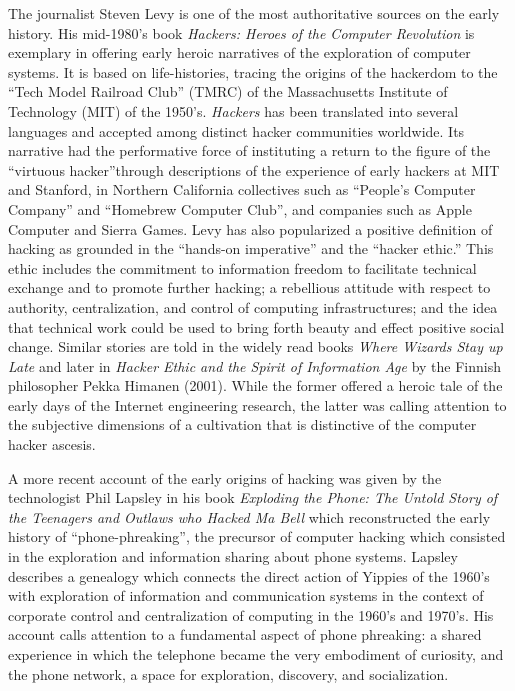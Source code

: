 \documentclass[10pt,letter,oneside]{scrartcl}
\begin{document}
The journalist Steven Levy is one of the most authoritative sources on the early
history. His mid-1980's book \emph{Hackers: Heroes of the Computer
  Revolution} \autocite{levy_hackers:_1984} is exemplary in offering early
heroic narratives of the exploration of computer systems. It is based on
life-histories, tracing the origins of the hackerdom to the ``Tech Model
Railroad Club'' (TMRC) of the Massachusetts Institute of Technology (MIT) of the
1950's. \emph{Hackers} has been translated into several languages and accepted
among distinct hacker communities worldwide.  Its narrative had the performative
force of instituting a return to the figure of the ``virtuous hacker''through
descriptions of the experience of early hackers at MIT and Stanford, in Northern
California collectives such as ``People's Computer Company'' and ``Homebrew
Computer Club'', and companies such as Apple Computer and Sierra Games.  Levy
has also popularized a positive definition of hacking as grounded in the
``hands-on imperative'' and the ``hacker ethic.''  This ethic includes the
commitment to information freedom to facilitate technical exchange and to
promote further hacking; a rebellious attitude with respect to authority,
centralization, and control of computing infrastructures; and the idea that
technical work could be used to bring forth beauty and effect positive social
change.  Similar stories are told in the widely read books \emph{Where Wizards
  Stay up Late} \autocite{hafner1998wizards} and later in \emph{Hacker Ethic
  and the Spirit of Information Age} by the Finnish philosopher Pekka Himanen
(2001). While the former offered a heroic tale of the early days of the Internet
engineering research, the latter was calling attention to the subjective
dimensions of a cultivation that is distinctive of the computer hacker ascesis.

A more recent account of the early origins of hacking was given by the
technologist Phil Lapsley \parencite*{lapsley_exploding_2013} in his book
\emph{Exploding the Phone: The Untold Story of the Teenagers and Outlaws who
  Hacked Ma Bell} which reconstructed the early history of ``phone-phreaking'',
the precursor of computer hacking which consisted in the exploration and
information sharing about phone systems.  Lapsley describes a genealogy which
connects the direct action of Yippies of the 1960's with exploration of
information and communication systems in the context of corporate control and
centralization of computing in the 1960's and 1970's.  His account calls
attention to a fundamental aspect of phone phreaking: a shared experience in
which the telephone became the very embodiment of curiosity, and the phone
network, a space for exploration, discovery, and socialization.
\end{document}
